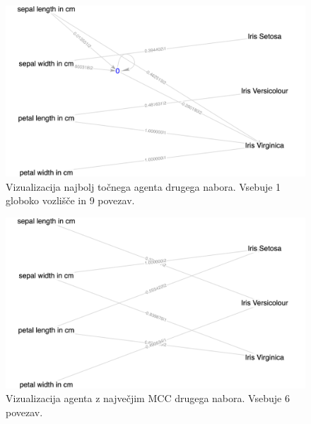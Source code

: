 \begin{figure}[H]
    \begin{center}
        \includegraphics[width=13cm]{iris/2/acc_g}
    \end{center}
    \caption{Vizualizacija najbolj točnega agenta drugega nabora. Vsebuje 1 globoko vozlišče in 9 povezav.}
    \label{fig:iris_acc_2_g}
\end{figure}

\begin{figure}[H]
    \begin{center}
        \includegraphics[width=13cm]{iris/2/mcc_g}
    \end{center}
    \caption{Vizualizacija agenta z največjim MCC drugega nabora. Vsebuje 6 povezav.}
    \label{fig:iris_mcc_2_g}
\end{figure}

